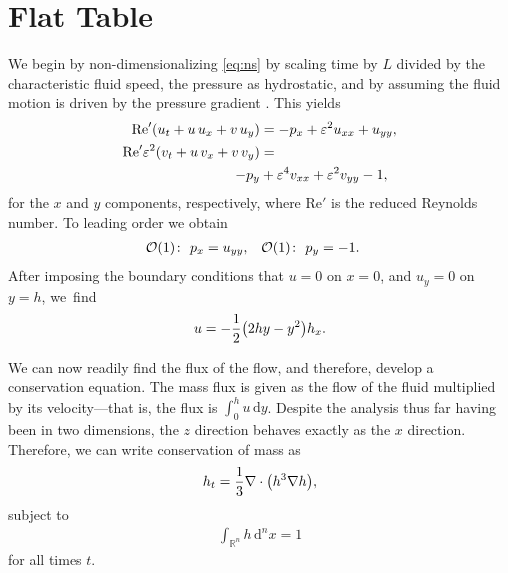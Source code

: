 \documentclass[11pt,a4paper,twocolumn]{article}
\let\originalleft\left
\let\originalright\right
\renewcommand{\left}{\mathopen{}\mathclose\bgroup\originalleft}
\renewcommand{\right}{\aftergroup\egroup\originalright}
\newcommand{\df}{\, \textrm{d}}
\newcommand{\eps}{\varepsilon}
\providecommand{\bigO}[1]{\ensuremath{\mathop{}\mathopen{}\mathcal{O}\mathopen{}\left(#1\right)}}
\begin{document}
\section{Flat Table}
\label{sec:flat}
We begin by non-dimensionalizing \eqref{eq:ns} by scaling time by $L$ divided by the characteristic fluid speed, the pressure as hydrostatic, and by assuming the fluid motion is driven by the pressure gradient \cite{howison}. This yields
\begin{align}
\nonumber \text{Re}' \left( u_t + u \, u_x + v \, u_y \right) &= - p_x + \eps^2 u_{xx} + u_{yy}, \\
\text{Re}' \eps^2 \left( v_t + u \, v_x + v \, v_y \right) &= \\
\nonumber - p_y &+ \eps^4 v_{xx} + \eps^2 v_{yy} - 1,
\end{align}
for the $x$ and $y$ components, respectively, where Re$'$ is the reduced Reynolds number. To leading order we obtain
\begin{align}
\bigO{1} \colon \ p_x &= u_{yy}, & \bigO{1} \colon \ p_y &= -1.
\end{align}
After imposing the boundary conditions that $u = 0$ on $x = 0$, and $u_y = 0$ on $y = h$, we~find
\begin{align}
u = -\frac{1}{2} \left( 2hy - y^2 \right) h_x.
\end{align}

We can now readily find the flux of the flow, and therefore, develop a conservation equation. The mass flux is given as the flow of the fluid multiplied by its velocity---that is, the flux is $\int_0^h u \df y$. Despite the analysis thus far having been in two dimensions, the $z$ direction behaves exactly as the $x$ direction. Therefore, we can write conservation of mass as
\begin{align}
h_t = \frac{1}{3} \nabla \cdot \left( h^3 \nabla h \right),
\label{eq:height}
\end{align}
subject to
\begin{align}
\int_{\mathbb{R}^n} h \df^n x = 1
\label{eq:int}
\end{align}
for all times $t$.
\end{document}
